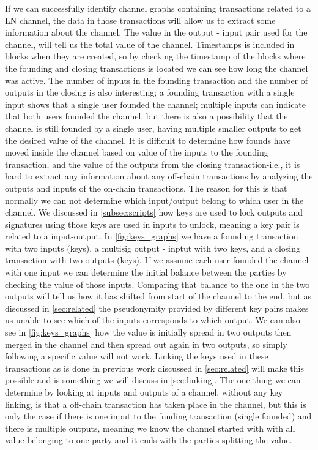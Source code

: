 If we can successfully identify channel graphs containing transactions related to a LN channel, the data in those transactions will allow us to extract some information about the channel.
The value in the output - input pair used for the channel, will tell us the total value of the channel.
Timestamps is included in blocks when they are created, so by checking the timestamp of the blocks where the founding and closing transactions is located we can see how long the channel was active.
The number of inputs in the founding transaction and the number of outputs in the closing is also interesting; a founding transaction with a single input shows that a single user founded the channel; multiple inputs can indicate that both users founded the channel, but there is also a possibility that the channel is still founded by a single user, having multiple smaller outputs to get the desired value of the channel.
It is difficult to determine how founds have moved inside the channel based on value of the inputs to the founding transaction, and the value of the outputs from the closing transaction-i.e., it is hard to extract any information about any off-chain transactions by analyzing the outputs and inputs of the on-chain transactions.
The reason for this is that normally we can not determine which input/output belong to which user in the channel.
We discussed in \cref{subsec:scripts} how keys are used to lock outputs and signatures using those keys are used in inputs to unlock, meaning a key pair is related to a input-output.
In \cref{fig:keys_graphs} we have a founding transaction with two inputs (keys), a multisig output - inptut with two keys, and a closing transaction with two outputs (keys).
If we assume each user founded the channel with one input we can determine the initial balance between the parties by checking the value of those inputs.
Comparing that balance to the one in the two outputs will tell us how it has shifted from start of the channel to the end, but as discussed in \cref{sec:related} the pseudonymity provided by different key pairs makes us unable to see which of the inputs corresponds to which output.
We can also see in \cref{fig:keys_graphs} how the value is initially spread in two outputs then merged in the channel and then spread out again in two outputs, so simply following a specific value will not work.
Linking the keys used in these transactions as is done in previous work discussed in \cref{sec:related} will make this possible and is something we will discuss in \cref{sec:linking}.
The one thing we can determine by looking at inputs and outputs of a channel, without any key linking, is that a off-chain transaction has taken place in the channel, but this is only the case if there is one input to the funding transaction (single founded) and there is multiple outputs, meaning we know the channel started with with all value belonging to one party and it ends with the parties splitting the value.
\\

